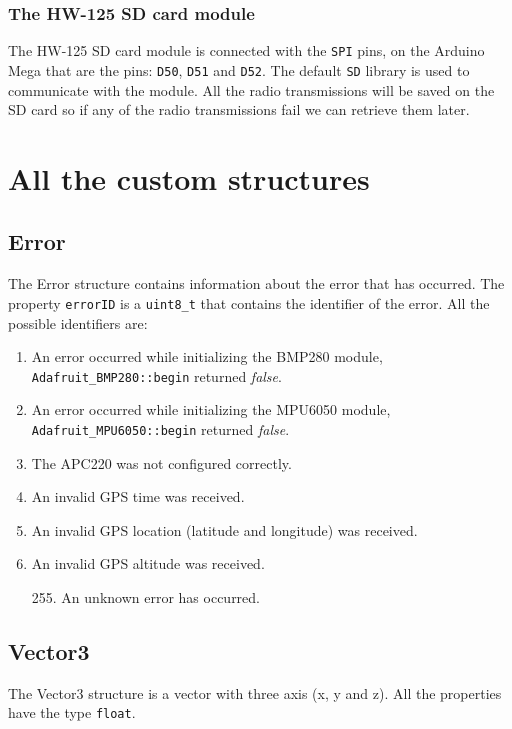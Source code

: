 \documentclass[a4paper,10pt]{article}
\begin{document}
				\vspace{1ex}
				
				\subsubsection[HW-125]{The HW-125 SD card module}
					The HW-125 SD card module is connected with the \texttt{SPI} pins, on the Arduino Mega that are the pins: \texttt{D50}, \texttt{D51} and \texttt{D52}. 
					The default \texttt{SD} library is used to communicate with the module. All the radio transmissions will be saved on the SD card so if any of the radio transmissions fail we can retrieve them later. 
	
		
	\clearpage
	
	\section[Structs]{All the custom structures}
		\subsection{Error}
			The Error structure contains information about the error that has occurred. 
			The property \texttt{errorID} is a \texttt{uint8\_t} that contains the identifier of the error. All the possible identifiers are:
				\begin{enumerate}
					\item An error occurred while initializing the BMP280 module, \texttt{Adafruit\_BMP280::begin} returned \emph{false}. 
					\item An error occurred while initializing the MPU6050 module, \texttt{Adafruit\_MPU6050::begin} returned \emph{false}. 
					\item The APC220 was not configured correctly. 
					\item An invalid GPS time was received. 
					\item An invalid GPS location (latitude and longitude) was received. 
					\item An invalid GPS altitude was received. 
					\item[255.] An unknown error has occurred. 
				\end{enumerate}
		
		\vspace{1ex}
		
		\subsection{Vector3}
			The Vector3 structure is a vector with three axis (x, y and z). All the properties have the type \texttt{float}. 
	
\end{document}
